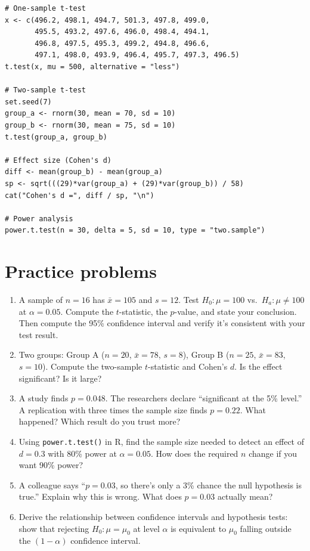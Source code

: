 \begin{codelab}
\begin{lstlisting}[language=Rlang]
# One-sample t-test
x <- c(496.2, 498.1, 494.7, 501.3, 497.8, 499.0,
       495.5, 493.2, 497.6, 496.0, 498.4, 494.1,
       496.8, 497.5, 495.3, 499.2, 494.8, 496.6,
       497.1, 498.0, 493.9, 496.4, 495.7, 497.3, 496.5)
t.test(x, mu = 500, alternative = "less")

# Two-sample t-test
set.seed(7)
group_a <- rnorm(30, mean = 70, sd = 10)
group_b <- rnorm(30, mean = 75, sd = 10)
t.test(group_a, group_b)

# Effect size (Cohen's d)
diff <- mean(group_b) - mean(group_a)
sp <- sqrt(((29)*var(group_a) + (29)*var(group_b)) / 58)
cat("Cohen's d =", diff / sp, "\n")

# Power analysis
power.t.test(n = 30, delta = 5, sd = 10, type = "two.sample")
\end{lstlisting}
\end{codelab}

\section{Practice problems}

\begin{enumerate}
  \item A sample of $n = 16$ has $\bar{x} = 105$ and $s = 12$. Test $H_0\colon \mu = 100$ vs.\ $H_a\colon \mu \neq 100$ at $\alpha = 0.05$. Compute the $t$-statistic, the $p$-value, and state your conclusion. Then compute the 95\% confidence interval and verify it's consistent with your test result.

  \item Two groups: Group A ($n = 20$, $\bar{x} = 78$, $s = 8$), Group B ($n = 25$, $\bar{x} = 83$, $s = 10$). Compute the two-sample $t$-statistic and Cohen's $d$. Is the effect significant? Is it large?

  \item A study finds $p = 0.048$. The researchers declare ``significant at the 5\% level.'' A replication with three times the sample size finds $p = 0.22$. What happened? Which result do you trust more?

  \item Using \texttt{power.t.test()} in R, find the sample size needed to detect an effect of $d = 0.3$ with 80\% power at $\alpha = 0.05$. How does the required $n$ change if you want 90\% power?

  \item A colleague says ``$p = 0.03$, so there's only a 3\% chance the null hypothesis is true.'' Explain why this is wrong. What does $p = 0.03$ actually mean?

  \item Derive the relationship between confidence intervals and hypothesis tests: show that rejecting $H_0\colon \mu = \mu_0$ at level $\alpha$ is equivalent to $\mu_0$ falling outside the $(1-\alpha)$ confidence interval.
\end{enumerate}


